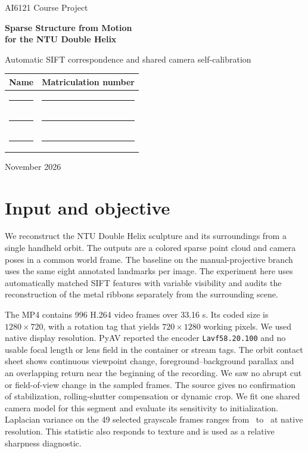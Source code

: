 \documentclass[11pt,a4paper]{article}
\begin{document}
\begin{titlepage}
  \centering
  \vspace*{0.24\textheight}
  {\large AI6121 Course Project\par}
  \vspace{1.5em}
  {\LARGE\bfseries Sparse Structure from Motion\\[0.25em] for the NTU Double Helix\par}
  \vspace{0.6em}
  {\large Automatic SIFT correspondence and shared camera self-calibration\par}
  \vspace{3.2em}
  \begin{tabular}{@{}ll@{}}
    \toprule
    \textbf{Name} & \textbf{Matriculation number} \\
    \midrule
    \rule{55mm}{0.35pt} & \rule{47mm}{0.35pt} \\[0.9em]
    \rule{55mm}{0.35pt} & \rule{47mm}{0.35pt} \\[0.9em]
    \rule{55mm}{0.35pt} & \rule{47mm}{0.35pt} \\
    \bottomrule
  \end{tabular}
  \vfill
  {November 2026\par}
\end{titlepage}

\section{Input and objective}

We reconstruct the NTU Double Helix sculpture and its surroundings from a single handheld orbit. The outputs are a colored sparse point cloud and camera poses in a common world frame. The baseline on the manual-projective branch uses the same eight annotated landmarks per image. The experiment here uses automatically matched SIFT features with variable visibility and audits the reconstruction of the metal ribbons separately from the surrounding scene.

The MP4 contains 996 H.264 video frames over 33.16 s. Its coded size is
\(1280\times720\), with a rotation tag that yields \(720\times1280\) working
pixels. We used native display resolution. PyAV reported the encoder
\texttt{Lavf58.20.100} and no usable focal length or lens field in the container
or stream tags. The orbit contact sheet shows continuous viewpoint change,
foreground--background parallax and an overlapping return near the beginning
of the recording. We saw no abrupt cut or field-of-view change in the sampled
frames. The source gives no confirmation of stabilization, rolling-shutter
compensation or dynamic crop. We fit one shared camera model for this segment
and evaluate its sensitivity to initialization. Laplacian variance on the
49 selected grayscale frames ranges from \BlurMinimum\ to \BlurMaximum\
at native resolution. This statistic also responds to texture and is used
as a relative sharpness diagnostic.
\end{document}
